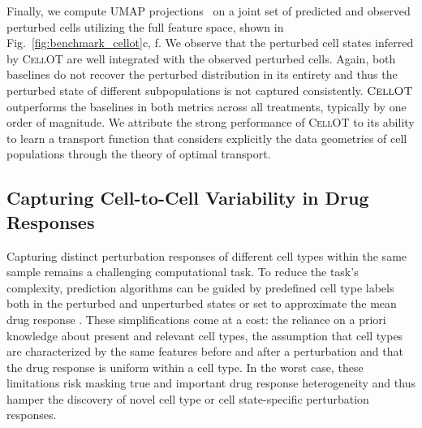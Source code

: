  Finally, we compute UMAP projections~\citep{umap} on a joint set of predicted and observed perturbed cells utilizing the full feature space, shown in Fig.~\ref{fig:benchmark_cellot}c, f.
We observe that the perturbed cell states inferred by \textsc{CellOT} are well integrated with the observed perturbed cells. Again, both baselines do not recover the perturbed distribution in its entirety %
and thus the perturbed state of different subpopulations is not captured consistently.
$\textsc{CellOT}$ outperforms the baselines in both metrics across all treatments, typically by one order of magnitude.
We attribute the strong performance of \textsc{CellOT} to its ability to learn a transport function that considers explicitly the data geometries of cell populations through the theory of optimal transport.

\subsection{Capturing Cell-to-Cell Variability in Drug Responses}
 Capturing distinct perturbation responses of different cell types within the same sample remains a challenging computational task. To reduce the task's complexity, prediction algorithms can be guided by predefined cell type labels both in the perturbed and unperturbed states \citep{chen2020dissecting} or set to approximate the mean drug response \citep{lotfollahi2019scgen}.  These simplifications come at a cost: the reliance on a priori knowledge about present and relevant cell types, the assumption that cell types are characterized by the same features before and after a perturbation and that the drug response is uniform within a cell type.
In the worst case, these limitations risk masking true and important drug response heterogeneity  and thus hamper the discovery of novel cell type or cell state-specific perturbation responses.

